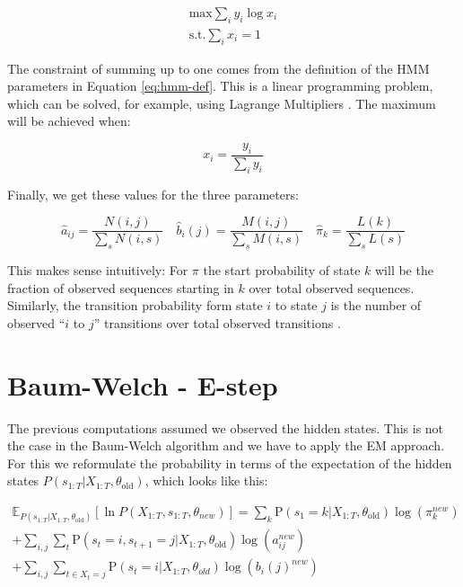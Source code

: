 \begin{equation}
   \begin{aligned}
\text{max} \sum_{i} y_{i} \log x_{i} \\
\text{s.t.} \sum_{i} x_{i}=1
   \end{aligned}
  \label{eq:lp-statement}
\end{equation}

The constraint of summing up to one comes from the definition of the HMM parameters in Equation \eqref{eq:hmm-def}. This is a linear programming problem, which can be solved, for example, using Lagrange Multipliers \parencite{huang2001spoken}. The maximum will be achieved when: 

\begin{equation}
  x_{i}=\frac{y_{i}}{\sum_{i} y_{i}} 
  \label{eq:lp-solution}
\end{equation}

Finally, we get these values for the three parameters: 

\begin{equation}
  \hat{a}_{i j}=\frac{N(i, j)}{\sum_{s} N(i, s)} \quad \hat{b}_{i}(j)=\frac{M(i, j)}{\sum_{s} M(i, s)} \quad \hat{\pi}_{k}=\frac{L(k)}{\sum_{s} L(s)} 
\end{equation}

This makes sense intuitively: For $\pi$ the start probability of state $k$ will be the fraction of observed sequences starting in $k$ over total observed sequences. Similarly, the transition probability form state $i$ to state $j$ is the number of observed ``$i$ to $j$'' transitions over total observed transitions \parencite{miningmassivedatasets}. 

\section{Baum-Welch - E-step}

The previous computations assumed we observed the hidden states. This is not the case in the Baum-Welch algorithm and we have to apply the EM approach. For this we reformulate the probability in terms of the expectation of the hidden states $P\left(s_{1: T} | X_{1: T}, \theta_{\text {old}}\right)$, which looks like this:

\begin{equation}
\begin{split}
\mathbb{E}_{P\left(s_{1: T} | X_{1: T}, 
\theta_{\text {old}}\right)}\left[\ln P\left(X_{1: T}, s_{1: T}, \theta_{n e w}\right)\right] 
=\sum_{k} \mathrm{P}\left(s_{1}=k | X_{1: T}, \theta_{\text {old}}\right) \log \left(\pi_{k}^{n e w}\right) \\
+\sum_{i, j} \sum_{t} \mathrm{P}\left(s_{t}=i, s_{t+1}=j | X_{1: T}, \theta_{\text {old}}\right) \log \left(a_{i j}^{n e w}\right) \\
+\sum_{i, j} \sum_{t \in X_t = j} \mathrm{P}\left(s_{t}=i | X_{1: T}, \theta_{o l d}\right)    \log \left(b_{i}(j)^{n e w}\right)
\end{split}
\end{equation}

